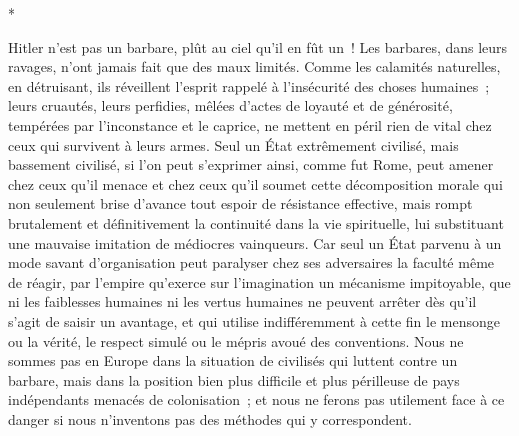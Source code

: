 \documentclass[french,twoside]{book} %
\begin{document}
\begin{center}
*\end{center}
\noindent Hitler n'est pas un barbare, plût au ciel qu'il en fût un ! Les barbares, dans leurs ravages, n'ont jamais fait que des maux limités. Comme les calamités naturelles, en détruisant, ils réveillent l'esprit rappelé à l'insécurité des choses humaines ; leurs cruautés, leurs perfidies, mêlées d'actes de loyauté et de générosité, tempérées par l'inconstance et le caprice, ne mettent en péril rien de vital chez ceux qui survivent à leurs armes. Seul un État extrêmement civilisé, mais bassement civilisé, si l'on peut s'exprimer ainsi, comme fut Rome, peut amener chez ceux qu'il menace et chez ceux qu'il soumet cette décomposition morale qui non seulement brise d'avance tout espoir de résistance effective, mais rompt brutalement et définitivement la continuité dans la vie spirituelle, lui substituant une mauvaise imitation de médiocres vainqueurs. Car seul un État parvenu à un mode savant d'organisation peut paralyser chez ses adversaires la faculté même de réagir, par l'empire qu'exerce sur l'imagination un mécanisme impitoyable, que ni les faiblesses humaines ni les vertus humaines ne peuvent arrêter dès qu'il s'agit de saisir un avantage, et qui utilise indifféremment à cette fin le mensonge ou la vérité, le respect simulé ou le mépris avoué des conventions. Nous ne sommes pas en Europe dans la situation de civilisés qui luttent contre un barbare, mais dans la position bien plus difficile et plus périlleuse de pays indépendants menacés de colonisation ; et nous ne ferons pas utilement face à ce danger si nous n'inventons pas des méthodes qui y correspondent.\par

\begin{center}
\end{center}
\end{document}
